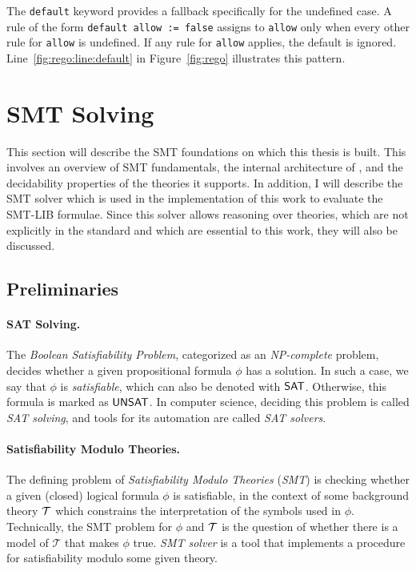 The \texttt{default} keyword provides a fallback specifically for the undefined case.
A rule of the form \texttt{default allow := false} assigns \false to \texttt{allow} only when every other rule for \texttt{allow} is undefined.
If any rule for \texttt{allow} applies, the default is ignored.
Line~\ref{fig:rego:line:default} in Figure~\ref{fig:rego} illustrates this pattern.

\section{SMT Solving}
\label{sec:smt}


This section will describe the SMT foundations on which this thesis is built.
This involves an overview of SMT fundamentals, the internal architecture of \ziii, and the decidability properties of the theories it supports.
In addition, I will describe the \ziii SMT solver which is used in the implementation of this work to evaluate the SMT-LIB formulae.
Since this solver allows reasoning over theories, which are not explicitly in the \smtlib standard and which are essential to this work, they will also be discussed.

\subsection{Preliminaries}

\paragraph{SAT Solving.}
The \emph{Boolean Satisfiability Problem}, categorized as an \emph{NP-complete} problem, decides whether a given propositional formula $\phi$ has a solution.
In such a case, we say that $\phi$ is \emph{satisfiable}, which can also be denoted with $\mathsf{SAT}$.
Otherwise, this formula is marked as $\mathsf{UNSAT}$.
In computer science, deciding this problem is called \emph{SAT solving}, and tools for its automation are called \emph{SAT solvers}.

\paragraph{Satisfiability Modulo Theories.}
The defining problem of \emph{Satisfiability Modulo Theories} (\emph{SMT}) is checking whether a given (closed) logical formula $\phi$ is satisfiable, in the context of some background theory $\mathcal{T}$ which constrains the interpretation of the symbols used in $\phi$\cite{smt:sm-theories, smt:first-ord-logic}.
Technically, the SMT problem for $\phi$ and $\mathcal{T}$ is the question of whether there is a model of $\mathcal{T}$ that makes $\phi$ true.
\emph{SMT solver} is a tool that implements a procedure for satisfiability modulo some given theory. 

